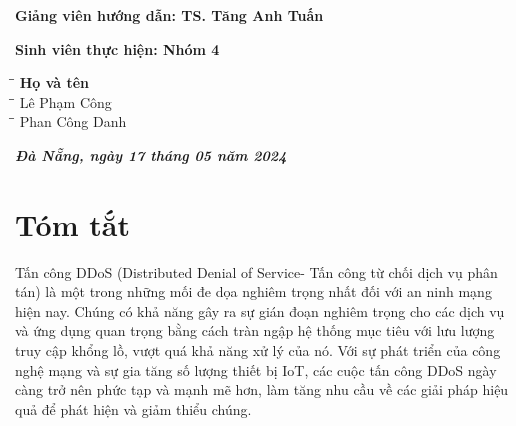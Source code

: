 \documentclass[a4paper]{article}
\begin{document}
\begin{titlepage}
\vspace{50pt}
\begin{addmargin}[1cm]{0cm}
\textbf{Giảng viên hướng dẫn: \hspace{2cm}TS. Tăng Anh Tuấn}
\end{addmargin}
\vspace{10pt}
\begin{addmargin}[1cm]{0cm}
\textbf{Sinh viên thực hiện: \hspace{2.6cm}Nhóm 4}
\begin{tabbing}
\hspace{6cm}\=\hspace{3cm}\=\hspace{5cm} \kill
{\textbf{Họ và tên}}\\
\hspace{6cm}\=\hspace{3cm}\=\hspace{5cm} \kill
Lê Phạm Công\\
\hspace{6cm}\=\hspace{3cm}\=\hspace{5cm} \kill
Phan Công Danh\\

\end{tabbing}
\end{addmargin}
\vspace{1cm}
\begin{center}
    \textit{\textbf{Đà Nẵng, ngày 17 tháng 05 năm 2024}}
\end{center}
\end{titlepage}
\newpage
\tableofcontents
\newpage


\section*{Tóm tắt}
Tấn công DDoS (Distributed Denial of Service- Tấn công từ chối dịch vụ phân tán) là một trong những mối đe dọa nghiêm trọng nhất đối với an ninh mạng hiện nay. Chúng có khả năng gây ra sự gián đoạn nghiêm trọng cho các dịch vụ và ứng dụng quan trọng bằng cách tràn ngập hệ thống mục tiêu với lưu lượng truy cập khổng lồ, vượt quá khả năng xử lý của nó. Với sự phát triển của công nghệ mạng và sự gia tăng số lượng thiết bị IoT, các cuộc tấn công DDoS ngày càng trở nên phức tạp và mạnh mẽ hơn, làm tăng nhu cầu về các giải pháp hiệu quả để phát hiện và giảm thiểu chúng.
\end{document}
